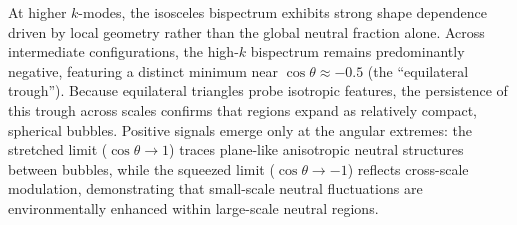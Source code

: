 \documentclass[apj,twocolumn, appendixfloats, twocolappendix, numberedappendix, tighten]{openjournal}
\begin{document}

At higher $k$-modes, the isosceles bispectrum exhibits strong shape dependence driven by local geometry rather than the global neutral fraction alone. Across intermediate configurations, the high-$k$ bispectrum remains predominantly negative, featuring a distinct minimum near $\cos\theta \approx -0.5$ (the ``equilateral trough''). Because equilateral triangles probe isotropic features, the persistence of this trough across scales confirms that  regions expand as relatively compact, spherical bubbles. Positive signals emerge only at the angular extremes: the stretched limit ($\cos\theta \to 1$) traces plane-like anisotropic neutral structures between bubbles, while the squeezed limit ($\cos\theta \to -1$) reflects cross-scale modulation, demonstrating that small-scale neutral fluctuations are environmentally enhanced within large-scale neutral regions.
\end{document}
